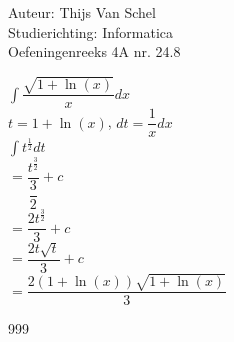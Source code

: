 \documentclass[a4paper]{article}
\begin{document}
  
\noindent \large Auteur: Thijs Van Schel \\
\noindent \large Studierichting: Informatica\\
\noindent \large Oefeningenreeks 4A nr. 24.8\\

\medskip

\normalsize

$\displaystyle\int\dfrac{\sqrt{1+\ln(x)}}{x}dx$ \\

$t = 1+\ln(x)$, $dt = \dfrac{1}{x}dx$\\

$\displaystyle\int t^{\tfrac{1}{2}}dt$\\

$= \dfrac{t^{\tfrac{3}{2}}}{\dfrac{3}{2}}+c$\\

$= \dfrac{2t^{\tfrac{3}{2}}}{3}+c$\\

$= \dfrac{2t\sqrt{t}}{3}+c$\\

$= \dfrac{2(1+\ln(x))\sqrt{1+\ln(x)}}{3}$\\

\begin{thebibliography}{999}
\end{thebibliography}
\end{document}
